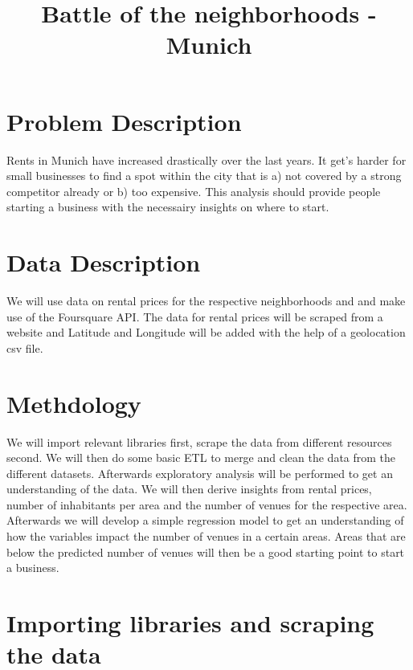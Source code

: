 \documentclass[11pt]{article}
\title{Battle of the neighborhoods - Munich}
\begin{document}
    
    
    \maketitle
    
    

    
    \section{Problem Description}\label{problem-description}

    Rents in Munich have increased drastically over the last years. It get's
harder for small businesses to find a spot within the city that is a)
not covered by a strong competitor already or b) too expensive. This
analysis should provide people starting a business with the necessairy
insights on where to start.

    \section{Data Description}\label{data-description}

    We will use data on rental prices for the respective neighborhoods and
and make use of the Foursquare API. The data for rental prices will be
scraped from a website and Latitude and Longitude will be added with the
help of a geolocation csv file.

    \section{Methdology}\label{methdology}

We will import relevant libraries first, scrape the data from different
resources second. We will then do some basic ETL to merge and clean the
data from the different datasets. Afterwards exploratory analysis will
be performed to get an understanding of the data. We will then derive
insights from rental prices, number of inhabitants per area and the
number of venues for the respective area. Afterwards we will develop a
simple regression model to get an understanding of how the variables
impact the number of venues in a certain areas. Areas that are below the
predicted number of venues will then be a good starting point to start a
business.

    \section{Importing libraries and scraping the
data}\label{importing-libraries-and-scraping-the-data}
\end{document}
